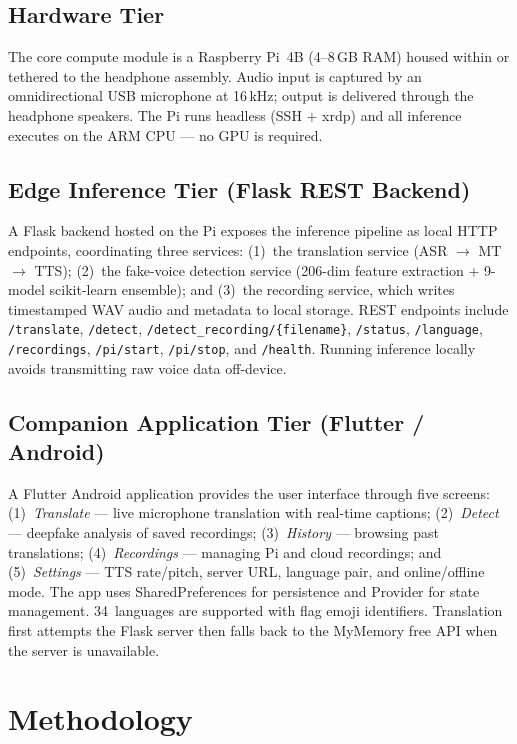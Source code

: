 \documentclass[10pt,twocolumn]{article}
\begin{document}
\subsection{Hardware Tier}
The core compute module is a Raspberry Pi~4B (4–8\,GB RAM) housed within or
tethered to the headphone assembly. Audio input is captured by an omnidirectional
USB microphone at 16\,kHz; output is delivered through the headphone speakers.
The Pi runs headless (SSH + xrdp) and all inference executes on the ARM CPU —
no GPU is required.

\subsection{Edge Inference Tier (Flask REST Backend)}
A Flask backend hosted on the Pi exposes the inference pipeline as local HTTP
endpoints, coordinating three services: (1)~the translation service
(ASR $\to$ MT $\to$ TTS); (2)~the fake-voice detection service
(206-dim feature extraction + 9-model scikit-learn ensemble); and
(3)~the recording service, which writes timestamped WAV audio and metadata
to local storage. REST endpoints include \texttt{/translate}, \texttt{/detect},
\texttt{/detect\_recording/\{filename\}}, \texttt{/status}, \texttt{/language},
\texttt{/recordings}, \texttt{/pi/start}, \texttt{/pi/stop}, and
\texttt{/health}. Running inference locally avoids transmitting raw voice data
off-device.

\subsection{Companion Application Tier (Flutter / Android)}
A Flutter Android application provides the user interface through five screens:
(1)~\textit{Translate} — live microphone translation with real-time captions;
(2)~\textit{Detect} — deepfake analysis of saved recordings;
(3)~\textit{History} — browsing past translations;
(4)~\textit{Recordings} — managing Pi and cloud recordings; and
(5)~\textit{Settings} — TTS rate/pitch, server URL, language pair, and
online/offline mode. The app uses SharedPreferences for persistence and Provider
for state management. 34~languages are supported with flag emoji identifiers.
Translation first attempts the Flask server then falls back to the MyMemory
free API when the server is unavailable.

\section{Methodology}
\end{document}
